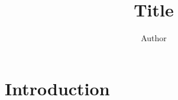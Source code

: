 \documentclass[11pt]{amsart}
\theoremstyle{definition}
\theoremstyle{remark}
\numberwithin{equation}{section}
\begin{document}
\title{Title}
\author{Author}
\address{Department, University, City, Country}
\email{}
\subjclass[2020]{}
\keywords{}

\begin{abstract}
\end{abstract}

\maketitle

\section{Introduction}\label{sec:introduction}





\end{document}
